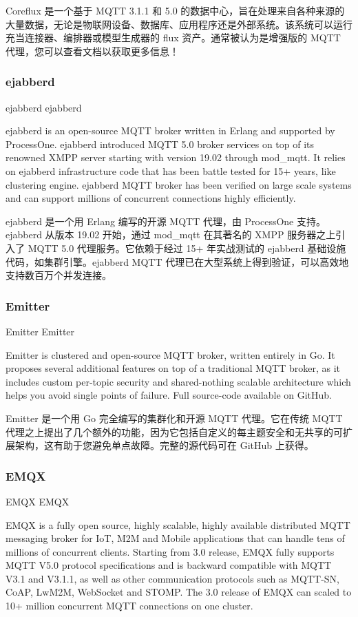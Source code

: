 \documentclass{ctexbook}
\begin{document}
Coreflux 是一个基于 MQTT 3.1.1 和 5.0 的数据中心，旨在处理来自各种来源的大量数据，无论是物联网设备、数据库、应用程序还是外部系统。该系统可以运行充当连接器、编排器或模型生成器的 flux 资产。通常被认为是增强版的 MQTT 代理，您可以查看文档以获取更多信息！

\subsubsection{ejabberd}
ejabberd ejabberd

ejabberd is an open-source MQTT broker written in Erlang and supported by ProcessOne. ejabberd introduced MQTT 5.0 broker services on top of its renowned XMPP server starting with version 19.02 through mod\_mqtt. It relies on ejabberd infrastructure code that has been battle tested for 15+ years, like clustering engine. ejabberd MQTT broker has been verified on large scale systems and can support millions of concurrent connections highly efficiently.

ejabberd 是一个用 Erlang 编写的开源 MQTT 代理，由 ProcessOne 支持。ejabberd 从版本 19.02 开始，通过 mod\_mqtt 在其著名的 XMPP 服务器之上引入了 MQTT 5.0 代理服务。它依赖于经过 15+ 年实战测试的 ejabberd 基础设施代码，如集群引擎。ejabberd MQTT 代理已在大型系统上得到验证，可以高效地支持数百万个并发连接。

\subsubsection{Emitter}
Emitter Emitter

Emitter is clustered and open-source MQTT broker, written entirely in Go. It proposes several additional features on top of a traditional MQTT broker, as it includes custom per-topic security and shared-nothing scalable architecture which helps you avoid single points of failure. Full source-code available on GitHub.

Emitter 是一个用 Go 完全编写的集群化和开源 MQTT 代理。它在传统 MQTT 代理之上提出了几个额外的功能，因为它包括自定义的每主题安全和无共享的可扩展架构，这有助于您避免单点故障。完整的源代码可在 GitHub 上获得。

\subsubsection{EMQX}
EMQX EMQX

EMQX is a fully open source, highly scalable, highly available distributed MQTT messaging broker for IoT, M2M and Mobile applications that can handle tens of millions of concurrent clients. Starting from 3.0 release, EMQX fully supports MQTT V5.0 protocol specifications and is backward compatible with MQTT V3.1 and V3.1.1, as well as other communication protocols such as MQTT-SN, CoAP, LwM2M, WebSocket and STOMP. The 3.0 release of EMQX can scaled to 10+ million concurrent MQTT connections on one cluster.
\end{document}
